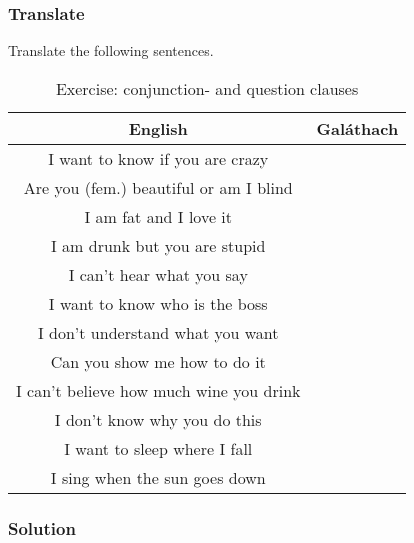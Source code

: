 \subsubsection{Translate}

Translate the following sentences.

\begin{table}[H]
\centering
\begin{tabular}{|c|M{5.0cm}|}
  \toprule
  \textbf{English} & \textbf{Gal\'{a}thach}\\
  \toprule
  I want to know if you are crazy & \\
  \midrule
  Are you (fem.) beautiful or am I blind & \\
  \midrule
  I am fat and I love it & \\
  \midrule
  I am drunk but you are stupid & \\
  \midrule
  I can't hear what you say & \\
  \midrule
  I want to know who is the boss & \\
  \midrule
  I don't understand what you want & \\
  \midrule
  Can you show me how to do it & \\
  \midrule
  I can't believe how much wine you drink & \\
  \midrule
  I don't know why you do this & \\
  \midrule
  I want to sleep where I fall & \\
  \midrule
  I sing when the sun goes down & \\
  \bottomrule
\end{tabular}
\label{exercise_conjunction_and_question_clauses}
\caption{Exercise: conjunction- and question clauses}
\end{table}

\newpage
\subsubsection{Solution}

